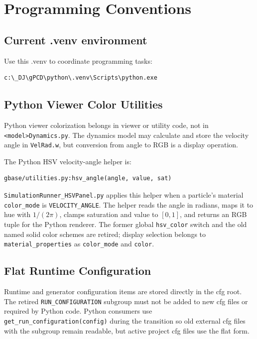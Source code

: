 
\newpage
\section{Programming Conventions}

\subsection{Current .venv environment}

Use this .venv to coordinate programming tasks:
\begin{verbatim}
c:\_DJ\gPCD\python\.venv\Scripts\python.exe
\end{verbatim}

\subsection{Python Viewer Color Utilities}

Python viewer colorization belongs in viewer or utility code, not in
\texttt{<model>Dynamics.py}.  The dynamics model may calculate and store the
velocity angle in \texttt{VelRad.w}, but conversion from angle to RGB is a
display operation.

The Python HSV velocity-angle helper is:
\begin{verbatim}
gbase/utilities.py:hsv_angle(angle, value, sat)
\end{verbatim}

\texttt{SimulationRunner\_HSVPanel.py} applies this helper when a particle's
material \texttt{color\_mode} is \texttt{VELOCITY\_ANGLE}.  The helper reads the
angle in radians, maps it to hue with \(1/(2\pi)\), clamps saturation and
value to \([0,1]\), and returns an RGB tuple for the Python renderer.  The
former global \texttt{hsv\_color} switch and the old named solid color schemes
are retired; display selection belongs to \texttt{material\_properties} as
\texttt{color\_mode} and \texttt{color}.

\subsection{Flat Runtime Configuration}

Runtime and generator configuration items are stored directly in the cfg root.
The retired \texttt{RUN\_CONFIGURATION} subgroup must not be added to new cfg
files or required by Python code.  Python consumers use
\texttt{get\_run\_configuration(config)} during the transition so old external
cfg files with the subgroup remain readable, but active project cfg files use
the flat form.


